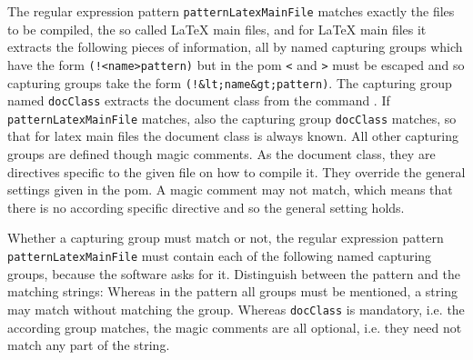 The regular expression pattern \texttt{patternLatexMainFile} 
matches exactly the files to be compiled, 
the so called \LaTeX{} main files, and for \LaTeX{} main files 
it extracts the following pieces of information, 
all by named capturing groups which have the form \texttt{(!<name>pattern)} 
but in the pom \texttt{<} and \texttt{>} must be escaped 
and so capturing groups take the form \texttt{(!\&lt;name\&gt;pattern)}. 
The capturing group named \texttt{docClass} extracts the document class 
from the command . 
If \texttt{patternLatexMainFile} matches, 
also the capturing group \texttt{docClass} matches, 
so that for latex main files the document class is always known. 
All other capturing groups are defined though magic comments. 
As the document class, they are directives specific to the given file 
on how to compile it. 
They override the general settings given in the pom. 
A magic comment may not match, 
which means that there is no according specific directive 
and so the general setting holds. 

Whether a capturing group must match or not, 
the regular expression pattern \texttt{patternLatexMainFile} 
must contain each of the following named capturing groups, 
because the software asks for it. 
Distinguish between the pattern and the matching strings: 
Whereas in the pattern all groups must be mentioned, 
a string may match without matching the group. 
Whereas \texttt{docClass} is mandatory, i.e. the according group matches, 
the magic comments are all optional, i.e. they need not match any part of the string. 

